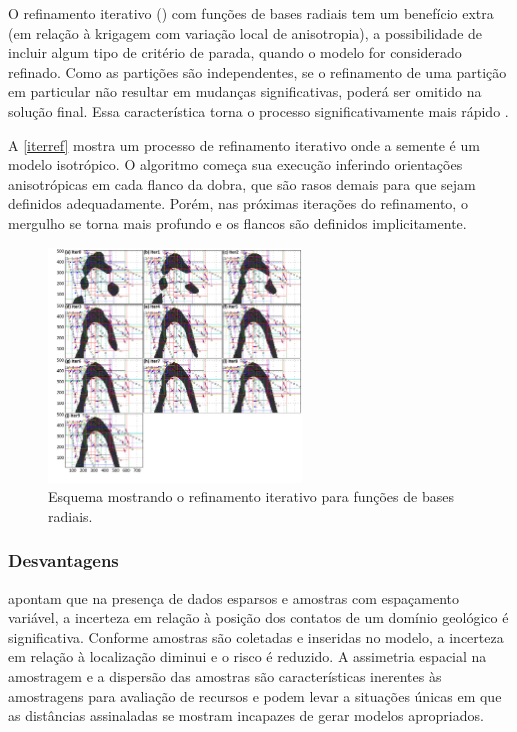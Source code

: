 O refinamento iterativo (\cite{martin2017iterative}) com funções de bases radiais tem um benefício extra (em relação à krigagem com variação local de anisotropia), a possibilidade de incluir algum tipo de critério de parada, quando o modelo for considerado refinado. Como as partições são independentes, se o refinamento de uma partição em particular não resultar em mudanças significativas, poderá ser omitido na solução final. Essa característica torna o processo significativamente mais rápido \cite{martin2017implicitmodeling}.

A \autoref{iterref} mostra um processo de refinamento iterativo onde a semente é um modelo isotrópico. O algoritmo começa sua execução inferindo orientações anisotrópicas em cada flanco da dobra, que são rasos demais para que sejam definidos adequadamente. Porém, nas próximas iterações do refinamento, o mergulho se torna mais profundo e os flancos são definidos implicitamente.

\begin{figure}[H]
\caption{\label{iterref} Esquema mostrando o refinamento iterativo para funções de bases radiais.}
	\centering
		\includegraphics[width=0.6\textwidth]{capitulo_2/imagens/iterref.jpg}
\end{figure}

\subsubsection{Desvantagens}\label{problemas}

 apontam que na presença de dados esparsos e amostras com espaçamento variável, a incerteza em relação à posição dos contatos de um domínio geológico é significativa. Conforme amostras são coletadas e inseridas no modelo, a incerteza em relação à localização diminui e o risco é reduzido. A assimetria espacial na amostragem e a dispersão das amostras são características inerentes às amostragens para avaliação de recursos e podem levar a situações únicas em que as distâncias assinaladas se mostram incapazes de gerar modelos apropriados. 

